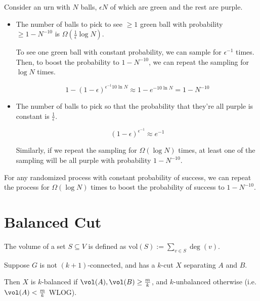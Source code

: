 Consider an urn with $N$ balls, $\epsilon N$ of which are green and the rest are purple.

\begin{itemize}
	\item The number of balls to pick to see $\ge 1$ green ball with probability $\ge 1 - N^{-10}$ is $\Omega(\frac{1}{\epsilon} \log N)$.

	      To see one green ball with constant probability, we can sample for $\epsilon^{-1}$ times. Then, to boost the probability to $1 - N^{-10}$, we can repeat the sampling for $\log N$ times.

	      \[ 1 - (1 - \epsilon)^{\epsilon^{-1} 10 \ln N} \approx 1 - e^{-10\ln N} = 1 - N^{-10} \]

	\item The number of balls to pick so that the probability that they're all purple is constant is $\frac{1}{\epsilon}$.

	      \[ (1 - \epsilon)^{\epsilon^{-1}} \approx e^{-1} \]

	      Similarly, if we repeat the sampling for $\Omega(\log N)$ times, at least one of the sampling will be all purple with probability $1 - N^{-10}$.

\end{itemize}

\begin{remark}
	For any randomized process with constant probability of success, we can repeat the process for $\Omega(\log N)$ times to boost the probability of success to $1 - N^{-10}$.
\end{remark}

\section{Balanced Cut}

\begin{definition}
	The volume of a set $S \subseteq V$ is defined as $\text{vol}(S) := \sum_{v \in S} \deg(v)$.
\end{definition}

\begin{definition}
	Suppose $G$ is not $(k+1)$-connected, and has a $k$-cut $X$ separating $A$ and $B$.

	Then $X$ is $k$-balanced if $\vol(A), \vol(B) \ge \frac{m}{k}$, and $k$-unbalanced otherwise (i.e. $\vol(A) < \frac{m}{k}$ WLOG).
\end{definition}

